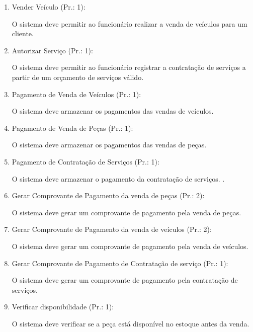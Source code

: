 \begin{enumerate}[
	label=RF\arabic{*}, 
	ref=(RF\arabic{*}),
	leftmargin=1.5em,
	itemindent=4.5em]
\item Vender Veículo (Pr.: 1):\par
O sistema deve permitir ao funcionário realizar a venda de veículos para um cliente.\par

\item Autorizar Serviço (Pr.: 1):\par
O sistema deve permitir ao funcionário registrar a contratação de serviços a partir de um orçamento de serviços válido.\par

\item Pagamento de Venda de Veículos (Pr.: 1):\par
O sistema deve armazenar os pagamentos das vendas de veículos. \par

\item Pagamento de Venda de Peças (Pr.: 1):\par
O sistema deve armazenar os pagamentos das vendas de peças.\par

\item Pagamento de Contratação de Serviços (Pr.: 1):\par
O sistema deve armazenar o pagamento da contratação de serviços. .\par

\item  Gerar Comprovante de Pagamento da venda de peças  (Pr.: 2):\par
O sistema deve gerar um comprovante de pagamento pela venda de peças.\par

\item Gerar Comprovante de Pagamento da venda de veículos  (Pr.: 2):\par
O sistema deve gerar um comprovante de pagamento pela venda de veículos.\par

\item Gerar Comprovante de Pagamento de Contratação de serviço (Pr.: 1):\par
O sistema deve gerar um comprovante de pagamento pela contratação de serviços.
\par

\item Verificar disponibilidade (Pr.: 1):\par
O sistema deve verificar se a peça está disponível no estoque antes da venda.\par


\end{enumerate}
